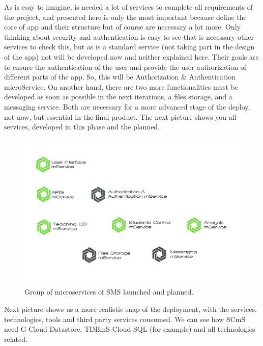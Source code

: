 As is esay to imagine, is needed a lot of services to complete all requirements
of the project, and presented here is only the most important because define the
core of app and their structure but of course are necessary a lot more.
Only thinking about security and authentication is easy to see that is necessary
other services to check this, but as is a standard service (not taking part in
the design of the app) not will be developed now and neither explained here.
Their goals are to ensure the authentication of the user and provide the user
authorization of different parts of the app. So, this will be Authorization \&
Authentication microService.
\intro
On another hand, there are two more functionalities must be developed as soon as
possible in the next iterations, a files storage, and a messaging service.
Both are necessary for a more advanced stage of the deploy, not now, but essential
in the final product. The next picture shows you all services, developed in this
phase and the planned.

\begin{figure}[H]
  \includegraphics[scale=0.22]{img/graphics/final_microservices_distribution.png}
  \centering
  \caption{Group of microservices of SMS launched and planned.}
\end{figure}

\noindent Next picture shows us a more realistic snap of the deployment, with
the services, technologies, tools and third party services consumed.
We can see how SCmS need G Cloud Datastore, TDBmS Cloud SQL (for example) and
all technologies related.

